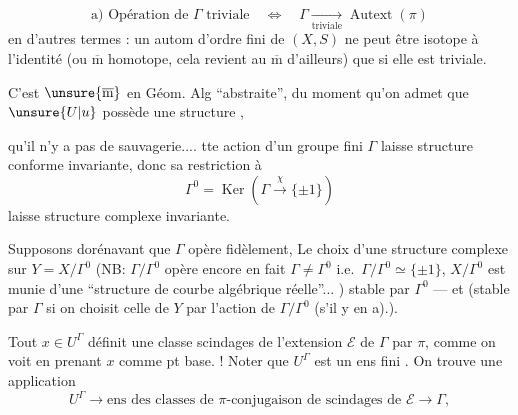 \[
\text{a) Opération de }\Gamma\text{ triviale}
\quad\Longleftrightarrow\quad
\Gamma\underset{\text{triviale}}{\longrightarrow}\operatorname{Autext}(\pi)
\]
en d'autres termes : un autom d'ordre fini de $(X,S)$ ne peut être isotope à l'identité (ou $\overline{\mathrm m}$  homotope, cela revient au $\overline{\mathrm m}$ d'ailleurs) que si elle est triviale.

C'est $\unsure{\overline{\mathrm m}}$  en Géom. Alg ``abstraite'', du moment qu'on admet que $\unsure{U|u}$ possède une structure  ,  


   qu'il n'y a pas de sauvagerie....  tte action d'un groupe fini $\Gamma$ laisse structure conforme invariante,  donc sa restriction à
\[
\Gamma^0=\operatorname{Ker}(\Gamma\xrightarrow{\chi}\{\pm1\})
\]
laisse structure complexe invariante.

Supposons dorénavant que $\Gamma$ opère fidèlement,   Le choix d'une structure complexe sur $Y=X/\Gamma^0$  (NB:  $\Gamma/\Gamma^0$ opère encore  en fait   $\Gamma\ne\Gamma^0$ i.e.\ $\Gamma/\Gamma^0\simeq\{\pm1\}$, $X/\Gamma^0$ est munie d'une ``structure de  courbe algébrique  réelle''... ) stable par $\Gamma^0$ --- et (stable par $\Gamma$ si on choisit celle de $Y$   par l'action  de $\Gamma/\Gamma^0$ (s'il y en a).).

 Tout $x\in U^\Gamma$ définit une classe   scindages de l'extension $\mathcal E$ de $\Gamma$ par $\pi$, comme on voit en prenant $x$ comme pt base. ! Noter que $U^\Gamma$ est un ens fini .
On trouve  une application
\[
U^\Gamma\longrightarrow\text{ens des classes de }\pi\text{-conjugaison de scindages de }\mathcal E\longrightarrow\Gamma,
\]


